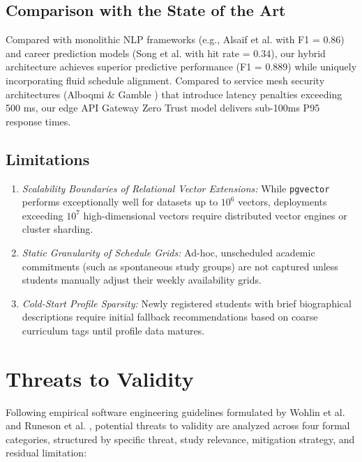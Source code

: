 \documentclass[a4paper,fleqn]{cas-dc}
\begin{document}
\subsection{Comparison with the State of the Art}
Compared with monolithic NLP frameworks (e.g., Alsaif et al. \cite{alsaif2022} with F1 = 0.86) and career prediction models (Song et al. \cite{song2022} with hit rate = 0.34), our hybrid architecture achieves superior predictive performance (F1 = 0.889) while uniquely incorporating fluid schedule alignment. Compared to service mesh security architectures (Alboqmi \& Gamble \cite{alboqmi2025}) that introduce latency penalties exceeding 500 ms, our edge API Gateway Zero Trust model delivers sub-100ms P95 response times.

\subsection{Limitations}
\begin{enumerate}
    \item \textit{Scalability Boundaries of Relational Vector Extensions:} While \texttt{pgvector} performs exceptionally well for datasets up to $10^6$ vectors, deployments exceeding $10^7$ high-dimensional vectors require distributed vector engines or cluster sharding.
    \item \textit{Static Granularity of Schedule Grids:} Ad-hoc, unscheduled academic commitments (such as spontaneous study groups) are not captured unless students manually adjust their weekly availability grids.
    \item \textit{Cold-Start Profile Sparsity:} Newly registered students with brief biographical descriptions require initial fallback recommendations based on coarse curriculum tags until profile data matures.
\end{enumerate}

\section{Threats to Validity}
\label{sec:threats}
Following empirical software engineering guidelines formulated by Wohlin et al. \cite{wohlin2012} and Runeson et al. \cite{runeson2012}, potential threats to validity are analyzed across four formal categories, structured by specific threat, study relevance, mitigation strategy, and residual limitation:
\end{document}
